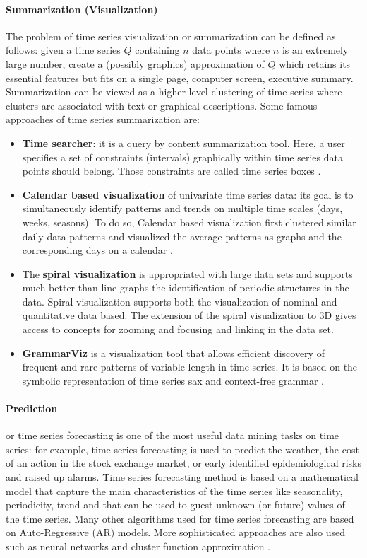 \paragraph{Summarization (Visualization)}
The problem of time series visualization or summarization can be defined as follows: given a time series $Q$ containing $n$ data points where $n$ is an extremely large number, create a (possibly graphics) approximation of $Q$ which retains its essential features but fits on a single page, computer screen, executive summary. Summarization can be viewed as a higher level clustering of time series  where clusters are associated with text or graphical descriptions. Some famous approaches of time series summarization  are:
\begin{itemize}

\item    \textbf{Time searcher}: it is a query by content summarization tool. Here, a user specifies a set of constraints (intervals) graphically within time series data points should belong. Those constraints are called time series boxes \cite{hochheiser2003interactive}.
\item    \textbf{Calendar based visualization} of univariate time series data: its goal is to simultaneously identify patterns and trends on multiple time scales (days, weeks, seasons). To do so, Calendar based visualization first clustered similar daily data patterns and visualized the average patterns as graphs and the corresponding days on a calendar \cite{van1999cluster}. 
\item    The \textbf{spiral visualization} is appropriated with large data sets and supports much better than line graphs the identification of periodic structures in the data. Spiral visualization supports both the visualization of nominal and quantitative data based. The extension of the spiral visualization to 3D gives access to concepts for zooming and focusing and linking in the data set\cite{weber2001visualizing}. 
\item    \textbf{GrammarViz} is a visualization tool that allows efficient discovery of frequent and rare patterns  of variable length in time series. It is based on the symbolic representation of time series sax and context-free grammar \cite{senin2014grammarviz}.
\end{itemize} 

\paragraph{Prediction} or time series forecasting is one of the most useful data mining tasks on time series: for example, time series forecasting is used to predict the weather, the cost of an action in the stock exchange market, or early identified epidemiological risks and raised up alarms. Time series forecasting method is based on a mathematical model that capture the main characteristics of the time series like seasonality, periodicity, trend and that can be used to guest unknown (or future) values of the time series. Many other algorithms used for time series forecasting are based on Auto-Regressive (AR) models. More sophisticated approaches are also used such as neural networks and cluster function approximation \cite{mahalakshmi2016survey}.
